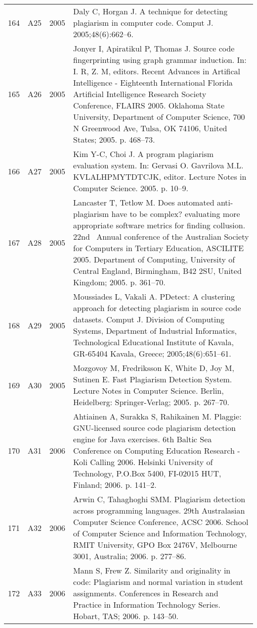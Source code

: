 \documentclass{article}\usepackage[]{graphicx}\usepackage[]{color}
\begin{document}
\begin{longtable}{l|L{1cm}|L{1cm}|L{12cm}|}
  164 & A25 & 2005 & Daly C, Horgan J. A technique for detecting plagiarism in computer code. Comput J. 2005;48(6):662–6. \\ 
  165 & A26 & 2005 & Jonyer I, Apiratikul P, Thomas J. Source code fingerprinting using graph grammar induction. In: I. R, Z. M, editors. Recent Advances in Artifical Intelligence - Eighteenth International Florida Artificial Intelligence Research Society Conference, FLAIRS 2005. Oklahoma State University, Department of Computer Science, 700 N Greenwood Ave, Tulsa, OK 74106, United States; 2005. p. 468–73. \\ 
  166 & A27 & 2005 & Kim Y-C, Choi J. A program plagiarism evaluation system. In: Gervasi O. Gavrilova M.L. KVLALHPMYTDTCJK, editor. Lecture Notes in Computer Science. 2005. p. 10–9. \\ 
  167 & A28 & 2005 & Lancaster T, Tetlow M. Does automated anti-plagiarism have to be complex? evaluating more appropriate software metrics for finding collusion. 22nd  Annual conference of the Australian Society for Computers in Tertiary Education, ASCILITE 2005. Department of Computing, University of Central England, Birmingham, B42 2SU, United Kingdom; 2005. p. 361–70. \\ 
  168 & A29 & 2005 & Moussiades L, Vakali A. PDetect: A clustering approach for detecting plagiarism in source code datasets. Comput J. Division of Computing Systems, Department of Industrial Informatics, Technological Educational Institute of Kavala, GR-65404 Kavala, Greece; 2005;48(6):651–61. \\ 
  169 & A30 & 2005 & Mozgovoy M, Fredriksson K, White D, Joy M, Sutinen E. Fast Plagiarism Detection System. Lecture Notes in Computer Science. Berlin, Heidelberg: Springer-Verlag; 2005. p. 267–70. \\ 
  170 & A31 & 2006 & Ahtiainen A, Surakka S, Rahikainen M. Plaggie: GNU-licensed source code plagiarism detection engine for Java exercises. 6th Baltic Sea Conference on Computing Education Research - Koli Calling 2006. Helsinki University of Technology, P.O.Box 5400, FI-02015 HUT, Finland; 2006. p. 141–2. \\ 
  171 & A32 & 2006 & Arwin C, Tahaghoghi SMM. Plagiarism detection across programming languages. 29th Australasian Computer Science Conference, ACSC 2006. School of Computer Science and Information Technology, RMIT University, GPO Box 2476V, Melbourne 3001, Australia; 2006. p. 277–86. \\ 
  172 & A33 & 2006 & Mann S, Frew Z. Similarity and originality in code: Plagiarism and normal variation in student assignments. Conferences in Research and Practice in Information Technology Series. Hobart, TAS; 2006. p. 143–50. \\ 

\end{longtable}
\end{document}
